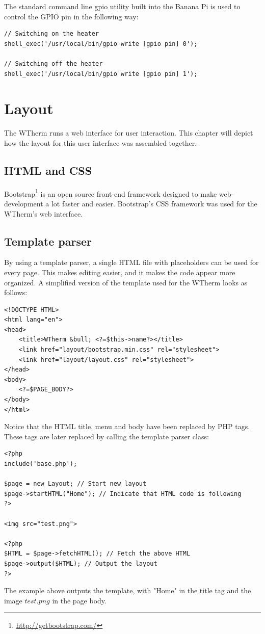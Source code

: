 \documentclass[12pt,a4paper,final]{report}
\begin{document}
The standard command line gpio utility built into the Banana Pi is used to control the GPIO pin in the following way:
\lstset{language=PHP}
\begin{lstlisting}[caption={Controlling GPIO in PHP}]
// Switching on the heater
shell_exec('/usr/local/bin/gpio write [gpio pin] 0');

// Switching off the heater
shell_exec('/usr/local/bin/gpio write [gpio pin] 1');
\end{lstlisting}

\chapter{Layout} \label{chap:layout}
The WTherm runs a web interface for user interaction. This chapter will depict how the layout for this user interface was assembled together.
\section{HTML and CSS}
Bootstrap\footnote{\url{http://getbootstrap.com/}} is an open source front-end framework designed to make web-development a lot faster and easier. Bootstrap's CSS framework was used for the WTherm's web interface.
\section{Template parser} \label{sec:TemplateParser}
By using a template parser, a single HTML file with placeholders can be used for every page. This makes editing easier, and it makes the code appear more organized. A simplified version of the template used for the WTherm looks as follows:
\lstset{language=HTML}
\begin{lstlisting}[caption={simplified HTML template},label={lst:htmltemplate}]
<!DOCTYPE HTML>
<html lang="en">
<head>
	<title>WTherm &bull; <?=$this->name?></title>
	<link href="layout/bootstrap.min.css" rel="stylesheet">
	<link href="layout/layout.css" rel="stylesheet">
</head>
<body>
	<?=$PAGE_BODY?>
</body>
</html>
\end{lstlisting}
Notice that the HTML title, menu and body have been replaced by PHP tags. These tags are later replaced by calling the template parser class:
\lstset{language=PHP}
\begin{lstlisting}[caption={Usage of the template parser class},label={lst:templateparser}]
<?php
include('base.php');

$page = new Layout; // Start new layout
$page->startHTML("Home"); // Indicate that HTML code is following
?>

<img src="test.png">

<?php
$HTML = $page->fetchHTML(); // Fetch the above HTML
$page->output($HTML); // Output the layout
?>
\end{lstlisting}
The example above outputs the template, with "Home" in the title tag and the image $test.png$ in the page body.
\end{document}

